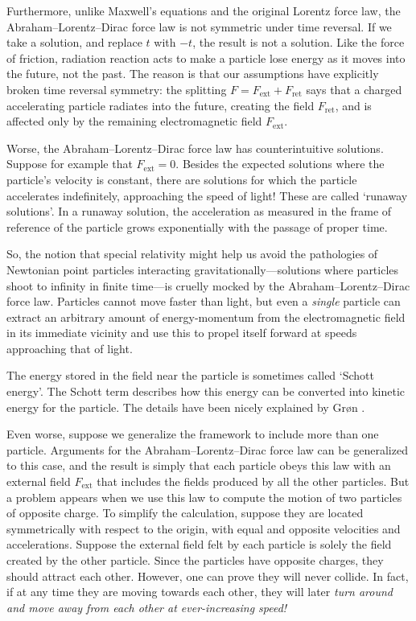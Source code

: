 \documentclass[12pt]{article}
\newcommand{\ret}{\mathrm{ret}}
\newcommand{\ext}{\mathrm{ext}}
\begin{document}
Furthermore, unlike Maxwell's equations and the original Lorentz force law, 
the Abraham--Lorentz--Dirac force law is not symmetric under time reversal.   
If we take a solution, and replace $t$ with $-t$, the result is not a solution.  
Like the force of friction, radiation reaction acts to make a particle lose energy as it moves into the future, not the past.  The reason is that our assumptions 
have explicitly broken time reversal symmetry: the splitting $F = F_\ext + F_\ret$ 
says that a charged accelerating particle radiates into the future, creating the field 
$F_\ret$, and is affected only by the remaining electromagnetic field $F_\ext$.

Worse, the Abraham--Lorentz--Dirac force law has counterintuitive solutions.   Suppose for example that $F_\ext = 0$.   Besides the expected solutions where the particle's velocity is constant, there are solutions for which the particle accelerates
indefinitely, approaching the speed of light!   These are called `runaway solutions'.
In a runaway solution, the acceleration as measured in the frame of reference of the particle grows exponentially with the passage of proper time.  

So, the notion that special relativity might help us avoid the pathologies of
Newtonian point particles interacting gravitationally---solutions where 
particles shoot to infinity in finite time---is cruelly mocked by the 
Abraham--Lorentz--Dirac force law.  Particles cannot move faster than light, but even a \emph{single} particle can extract an arbitrary amount of energy-momentum from the electromagnetic field in its immediate vicinity and use this to propel itself forward at speeds approaching that of light.  

The energy stored in the field near the particle is sometimes called `Schott energy'.    The Schott term describes how this energy can be converted into kinetic energy for the particle.  The details have been nicely explained by Gr\o n \cite{Gron}.

Even worse, suppose we generalize the framework to include more than one
particle.  Arguments for the Abraham--Lorentz--Dirac force law can be generalized to  this case, and the result is simply that each particle obeys this law with an 
external field $F_\ext$ that includes the fields produced by all the other particles.  
But a problem appears when we use this law to compute the motion of two particles of opposite charge.   To simplify the calculation, suppose they are located symmetrically with respect to the origin, with equal and opposite velocities and accelerations.   Suppose the external field felt by each particle is solely the field created by the other particle.   Since the particles have opposite charges, they should attract each other.  However, one can prove they will never collide.  In fact, if at any time they are moving towards each other, they will later \emph{turn around and move away from each other at ever-increasing speed!}
\end{document}
